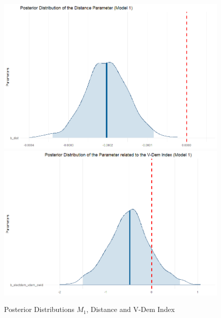 \documentclass[12pt,a4paper]{article}
\begin{document}
\begin{figure}[t]
\center
\label{F:3}
\includegraphics[scale=0.25]{PosteriorPlot_Distance_Model1.png}
\includegraphics[scale=0.25]{PosteriorPlot_VDem_Model1.png}
\caption{Posterior Distributions $M_1$, Distance and V-Dem Index}
\end{figure}
\end{document}

